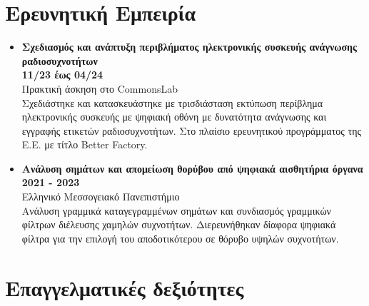 \documentclass[a4paper,9pt]{extarticle}
\begin{document}

\section*{Ερευνητική Εμπειρία}
\begin{itemize}
\item{\textbf{Σχεδιασμός και ανάπτυξη περιβλήματος ηλεκτρονικής συσκευής ανάγνωσης ραδιοσυχνοτήτων}} \\
        \textbf{11/23 έως 04/24} \\
        Πρακτική άσκηση στο CommonsLab \\
        Σχεδιάστηκε και κατασκευάστηκε με τρισδιάσταση εκτύπωση περίβλημα
        ηλεκτρονικής συσκευής με ψηφιακή οθόνη με δυνατότητα ανάγνωσης και
        εγγραφής ετικετών ραδιοσυχνοτήτων. Στο πλαίσιο ερευνητικού προγράμματος
        της Ε.Ε. με τίτλο Better Factory.\\
\item{\textbf{Ανάλυση σημάτων και απομείωση θορύβου από ψηφιακά αισθητήρια όργανα}}\\
        \textbf{2021 - 2023} \\
        Ελληνικό Μεσσογειακό Πανεπιστήμιο \\
        Ανάλυση γραμμικά καταγεγραμμένων σημάτων και συνδιασμός γραμμικών
        φίλτρων διέλευσης χαμηλών συχνοτήτων. Διερευνήθηκαν δίαφορα ψηφιακά φίλτρα
        για την επιλογή του αποδοτικότερου σε θόρυβο υψηλών συχνοτήτων. \\
\end{itemize}


\section*{Επαγγελματικές δεξιότητες}
\end{document}
